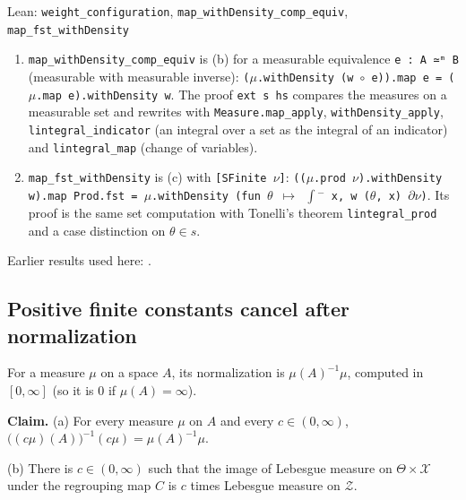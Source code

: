 \documentclass[11pt,a4paper]{report}
\begin{document}
\begin{leanbox}{Lean: \texttt{weight\_\allowbreak{}configuration}, \texttt{map\_\allowbreak{}withDensity\_\allowbreak{}comp\_\allowbreak{}equiv}, \texttt{map\_\allowbreak{}fst\_\allowbreak{}withDensity}}
\begin{enumerate}
\item \texttt{map\_\allowbreak{}with\allowbreak{}Density\_\allowbreak{}comp\_\allowbreak{}equiv} is (b) for a measurable equivalence \texttt{e : A ≃ᵐ B} (measurable with measurable inverse): \texttt{(\ensuremath{\mu}.\allowbreak{}with\allowbreak{}Density (w \ensuremath{\circ} e)).\allowbreak{}map e = (\ensuremath{\mu}.\allowbreak{}map e).\allowbreak{}with\allowbreak{}Density w}. The proof \texttt{ext s hs} compares the measures on a measurable set and rewrites with \texttt{Measure.\allowbreak{}map\_\allowbreak{}apply}, \texttt{with\allowbreak{}Density\_\allowbreak{}apply}, \texttt{lintegral\_\allowbreak{}indicator} (an integral over a set as the integral of an indicator) and \texttt{lintegral\_\allowbreak{}map} (change of variables).

\item \texttt{map\_\allowbreak{}fst\_\allowbreak{}with\allowbreak{}Density} is (c) with \texttt{[SFinite \ensuremath{\nu}]}: \texttt{((\ensuremath{\mu}.\allowbreak{}prod \ensuremath{\nu}).\allowbreak{}with\allowbreak{}Density w).\allowbreak{}map Prod.\allowbreak{}fst = \ensuremath{\mu}.\allowbreak{}with\allowbreak{}Density (fun \ensuremath{\theta} \ensuremath{\mapsto} \ensuremath{\int}\ensuremath{{}^{-}} x, w (\ensuremath{\theta}, x) \ensuremath{\partial}\ensuremath{\nu})}. Its proof is the same set computation with Tonelli's theorem \texttt{lintegral\_\allowbreak{}prod} and a case distinction on \(\theta\in s\).

\end{enumerate}
\end{leanbox}


Earlier results used here: \cite[Section~3.26.1]{LangevinLean2026ULASC}.
\subsection{\texorpdfstring{Positive finite constants cancel after normalization}{Positive finite constants cancel after normalization}}
\label{report-step-IPLA-MarginalConcentration-lean-8}


For a measure \(\mu\) on a space \(A\), its normalization is \(\mu(A)^{-1}\mu\), computed in \([0,\infty]\) (so it is \(0\) if \(\mu(A)=\infty\)).




\textbf{Claim.} (a) For every measure \(\mu\) on \(A\) and every \(c\in(0,\infty)\), \(\bigl((c\mu)(A)\bigr)^{-1}(c\mu)=\mu(A)^{-1}\mu\).




(b) There is \(c\in(0,\infty)\) such that the image of Lebesgue measure on \(\Theta\times\mathcal X\) under the regrouping map \(C\) is \(c\) times Lebesgue measure on \(\mathcal Z\).
\end{document}
